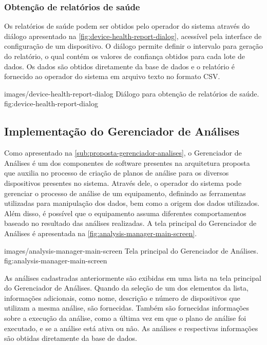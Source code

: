 \subsubsection{Obtenção de relatórios de saúde}

Os relatórios de saúde podem ser obtidos pelo operador do sistema através do diálogo apresentado na
\cref{fig:device-health-report-dialog}, acessível pela interface de configuração de um dispositivo.
O diálogo permite definir o intervalo para geração do relatório, o qual contém os valores de
confiança obtidos para cada lote de dados. Os dados são obtidos diretamente da base de dados e o
relatório é fornecido ao operador do sistema em arquivo texto no formato \gls{CSV}.

  {images/device-health-report-dialog}
  {Diálogo para obtenção de relatórios de saúde.}
  {fig:device-health-report-dialog}


\subsection{Implementação do Gerenciador de Análises}

Como apresentado na \cref{sub:proposta-gerenciador-analises}, o Gerenciador de Análises é um dos
componentes de software presentes na arquitetura proposta que auxilia no processo de criação de
planos de análise para os diversos dispositivos presentes no sistema. Através dele, o operador do
sistema pode gerenciar o processo de análise de um equipamento, definindo as ferramentas utilizadas
para manipulação dos dados, bem como a origem dos dados utilizados. Além disso, é possível que o
equipamento assuma diferentes comportamentos baseado no resultado das análises realizadas. A tela
principal do Gerenciador de Análises é apresentada na \cref{fig:analysis-manager-main-screen}.

  {images/analysis-manager-main-screen}
  {Tela principal do Gerenciador de Análises.}
  {fig:analysis-manager-main-screen}

As análises cadastradas anteriormente são exibidas em uma lista na tela principal do Gerenciador de
Análises. Quando da seleção de um dos elementos da lista, informações adicionais, como nome,
descrição e número de dispositivos que utilizam a mesma análise, são fornecidas. Também são
fornecidas informações sobre a execução da análise, como a última vez em que o plano de análise foi
executado, e se a análise está ativa ou não. As análises e respectivas informações são obtidas
diretamente da base de dados.


